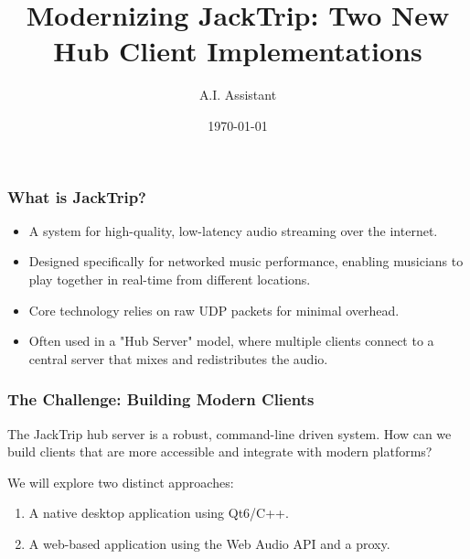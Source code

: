 \documentclass{beamer}
\title[JackTrip Clients]{Modernizing JackTrip: Two New Hub Client Implementations}
\author{A.I. Assistant}
\institute{Networked Music Performance}
\date{\today}
\begin{document}
\frame{\titlepage}

\begin{frame}
\frametitle{What is JackTrip?}
\begin{itemize}
    \item A system for high-quality, low-latency audio streaming over the internet.
    \item Designed specifically for networked music performance, enabling musicians to play together in real-time from different locations.
    \item Core technology relies on raw UDP packets for minimal overhead.
    \item Often used in a "Hub Server" model, where multiple clients connect to a central server that mixes and redistributes the audio.
\end{itemize}
\end{frame}

\begin{frame}
\frametitle{The Challenge: Building Modern Clients}
The JackTrip hub server is a robust, command-line driven system. How can we build clients that are more accessible and integrate with modern platforms?
\vspace{1cm}
\begin{center}
    \large We will explore two distinct approaches:
    \begin{enumerate}
        \item A native desktop application using Qt6/C++.
        \item A web-based application using the Web Audio API and a proxy.
    \end{enumerate}
\end{center}
\end{frame}
\end{document}
